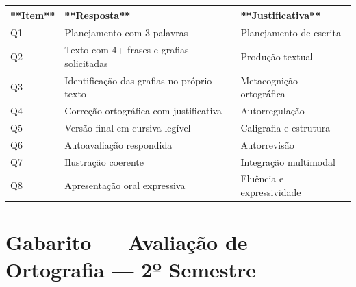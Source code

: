 \begin{center}
\renewcommand{\arraystretch}{1.5}
\begin{tabular}{lll}
\toprule
**Item** & **Resposta** & **Justificativa** \\
\midrule

Q1 & Planejamento com 3 palavras & Planejamento de escrita \\

Q2 & Texto com 4+ frases e grafias solicitadas & Produção textual \\

Q3 & Identificação das grafias no próprio texto & Metacognição ortográfica \\

Q4 & Correção ortográfica com justificativa & Autorregulação \\

Q5 & Versão final em cursiva legível & Caligrafia e estrutura \\

Q6 & Autoavaliação respondida & Autorrevisão \\

Q7 & Ilustração coerente & Integração multimodal \\

Q8 & Apresentação oral expressiva & Fluência e expressividade \\

\bottomrule
\end{tabular}
\end{center}

\section{Gabarito --- Avaliação de Ortografia — 2º Semestre}

